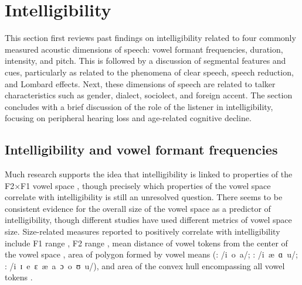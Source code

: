 
\section{Intelligibility}
This section first reviews past findings on intelligibility related to four commonly measured acoustic dimensions of speech: vowel formant frequencies, duration, intensity, and pitch.  This is followed by a discussion of segmental features and cues, particularly as related to the phenomena of clear speech, speech reduction, and Lombard effects.  Next, these dimensions of speech are related to talker characteristics such as gender, dialect, sociolect, and foreign accent.  The section concludes with a brief discussion of the role of the listener in intelligibility, focusing on peripheral hearing loss and age-related cognitive decline.%


\subsection{Intelligibility and vowel formant frequencies}
Much research supports the idea that intelligibility is linked to properties of the F2×F1 vowel space \citep[e.g.,][]{BondMoore1994, BradlowEtAl1996, HazanMarkham2004, Neel2008, McCloyEtAl2013}, though precisely which properties of the vowel space correlate with intelligibility is still an unresolved question.  There seems to be consistent evidence for the overall size of the vowel space as a predictor of intelligibility, though different studies have used different metrics of vowel space size.  Size-related measures reported to positively correlate with intelligibility include F1 range \citep{BradlowEtAl1996}, F2 range \citep{HazanMarkham2004}, mean distance of vowel tokens from the center of the vowel space \citep{BradlowEtAl1996, McCloyEtAl2013}, area of polygon formed by vowel means (\citealt{BradlowEtAl1996}: /i~o~a/; \citealt{Neel2008}: /i~æ~ɑ~u/;  \citealt{McCloyEtAl2012}: /i~ɪ~e~ɛ~æ~a~ɔ~o~ʊ~u/), and area of the convex hull encompassing all vowel tokens \citep{McCloyEtAl2013}.  

